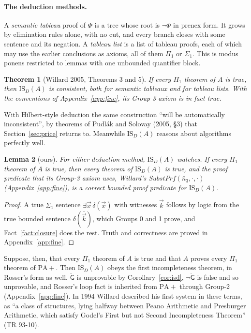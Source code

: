 \documentclass[11pt]{article}
\newcommand{\G}{\ddot{\mathsf{G}}}          %
\newcommand{\ISD}{\mathrm{IS}_D(A)}
\theoremstyle{plain}
\newtheorem{theorem}{Theorem}
\newtheorem{lemma}[theorem]{Lemma}
\theoremstyle{definition}
\begin{document}
\paragraph{The deduction methods.} A \emph{semantic tableau} proof of $\Phi$
is a tree whose root is $\neg\Phi$ in prenex form. It grows by elimination
rules alone, with no cut, and every branch closes with some sentence and its
negation. A \emph{tableau list} is a list of tableau proofs, each of which may
use the earlier conclusions as axioms, all of them $\Pi_1$ or $\Sigma_1$. This
is modus ponens restricted to lemmas with one unbounded quantifier block.

\begin{theorem}[Willard 2005, Theorems 3 and 5]\label{thm:willard}
If every $\Pi_1$ theorem of $A$ is true, then $\ISD$ is consistent, both for
semantic tableaux and for tableau lists. With the conventions of
Appendix~\ref{app:fine}, its Group-3 axiom is in fact true.
\end{theorem}

\noindent
With Hilbert-style deduction the same construction ``will be automatically
inconsistent'', by theorems of Pudlák and Solovay (2005, \S3) that
Section~\ref{sec:price} returns to. Meanwhile $\ISD$ reasons about algorithms
perfectly well.

\begin{lemma}[ours]\label{lem:watch}
For either deduction method, $\ISD$ watches. If every $\Pi_1$ theorem of $A$
is true, then every theorem of $\ISD$ is true, and the proof predicate that
its Group-3 axiom uses, Willard's $\mathit{SubstPrf}(\bar n_3, \cdot, \cdot)$
(Appendix~\ref{app:fine}), is a correct bounded proof predicate for $\ISD$.
\end{lemma}

\begin{proof}
A true $\Sigma_1$ sentence $\exists\vec x\,\delta(\vec x)$ with witnesses
$\vec k$ follows by logic from the true bounded sentence
$\delta(\bar{\vec k})$, which Groups 0 and 1 prove, and
Fact~\ref{fact:closure} does the rest. Truth and correctness are proved in
Appendix~\ref{app:fine}.
\end{proof}

\noindent
Suppose, then, that every $\Pi_1$ theorem of $A$ is true and that $A$ proves
every $\Pi_1$ theorem of $\mathrm{PA}{+}$. Then $\ISD$ obeys the first
incompleteness theorem, in Rosser's form as well. $\G$ is unprovable by
Corollary~\ref{cor:isd}, $\neg\G$ is false and so unprovable, and Rosser's
loop fact is inherited from $\mathrm{PA}{+}$ through Group-2
(Appendix~\ref{app:fine}). In 1994 Willard described his first system in
these terms, as ``a class of structures, lying halfway between Peano
Arithmetic and Presburger Arithmetic, which satisfy Godel's First but not
Second Incompleteness Theorem'' (TR 93-10).
\end{document}
